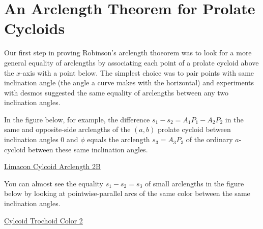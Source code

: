 \documentclass{ximera}
\begin{document}

\section{An Arclength Theorem for Prolate Cycloids}

Our first step in proving Robinson's arclength thoeorem was to look for a more general equality of arclengths by associating each point of a prolate cycloid above the $x$-axis with a point below. The simplest choice was to pair points with same inclination angle (the angle a curve makes with the horizontal) and experiments with desmos suggested the same equality of arclengths between any two inclination angles.

In the figure below, for example, the difference $s_1 - s_2 = A_1P_1 - A_2P_2$ in the same and opposite-side arclengths of the $(a,b)$ prolate cycloid between inclination angles $0$ and $\phi$ equals the arclength $s_3  = A_3P_3$ of the ordinary $a$-cycloid between these same inclination angles. 

\begin{onlineOnly}
    \begin{center}
\end{center}
\end{onlineOnly}

\href{https://www.desmos.com/calculator/0vodc6gvp5}{Limacon Cylcoid Arclength 2B}

You can almost see the equality $s_1 - s_2 = s_3$ of small arclengths in the figure below by looking at pointwise-parallel arcs of the same color between the same inclination angles.


\begin{onlineOnly}
    \begin{center}
\end{center}
\end{onlineOnly}

\href{https://www.desmos.com/calculator/yqw8ektvps}{Cylcoid Trochoid Color 2}

\end{document}
